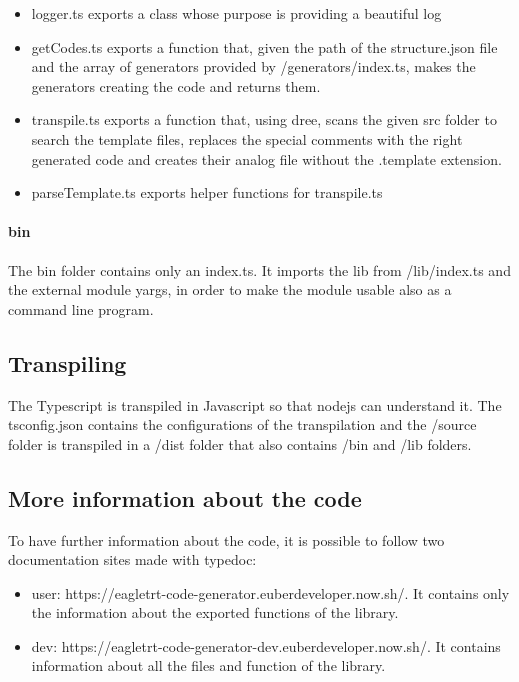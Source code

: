 \begin{itemize}
\begin{itemize}
            \item logger.ts exports a class whose purpose is providing a beautiful log
            \item getCodes.ts exports a function that, given the path of the structure.json file and the array of generators provided by /generators/index.ts, makes the generators creating the code and returns them.
            \item transpile.ts exports a function that, using dree, scans the given src folder to search the template files, replaces the special comments with the right generated code and creates their analog file without the .template extension.
            \item parseTemplate.ts exports helper functions for transpile.ts
        \end{itemize}
\end{itemize}

\paragraph{bin}
The bin folder contains only an index.ts. It imports the lib from /lib/index.ts and the external module yargs, in order to make the module usable also as
a command line program.

\subsection{Transpiling}
The Typescript is transpiled in Javascript so that nodejs can understand it. The tsconfig.json contains the configurations of the transpilation and the
/source folder is transpiled in a /dist folder that also contains /bin and /lib folders.

\subsection{More information about the code}
To have further information about the code, it is possible to follow two documentation sites made with typedoc:

\begin{itemize}
    \item user: https://eagletrt-code-generator.euberdeveloper.now.sh/. It contains only the information about the exported functions of the library.
    \item dev: https://eagletrt-code-generator-dev.euberdeveloper.now.sh/. It contains information about all the files and function of the library.
\end{itemize}

